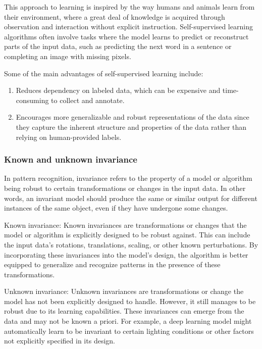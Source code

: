This approach to learning is inspired by the way humans and animals learn from their environment, where a great deal of knowledge is acquired through observation and interaction without explicit instruction. Self-supervised learning algorithms often involve tasks where the model learns to predict or reconstruct parts of the input data, such as predicting the next word in a sentence or completing an image with missing pixels.

Some of the main advantages of self-supervised learning include:

\begin{enumerate}
\item Reduces dependency on labeled data, which can be expensive and time-consuming to collect and annotate.
\item Encourages more generalizable and robust representations of the data since they capture the inherent structure and properties of the data rather than relying on human-provided labels.
\end{enumerate} 

\subsubsection{Known and unknown invariance}

In pattern recognition, invariance refers to the property of a model or algorithm being robust to certain transformations or changes in the input data. In other words, an invariant model should produce the same or similar output for different instances of the same object, even if they have undergone some changes.

Known invariance: Known invariances are transformations or changes that the model or algorithm is explicitly designed to be robust against. This can include the input data's rotations, translations, scaling, or other known perturbations. By incorporating these invariances into the model's design, the algorithm is better equipped to generalize and recognize patterns in the presence of these transformations.

Unknown invariance: Unknown invariances are transformations or change the model has not been explicitly designed to handle. However, it still manages to be robust due to its learning capabilities. These invariances can emerge from the data and may not be known a priori. For example, a deep learning model might automatically learn to be invariant to certain lighting conditions or other factors not explicitly specified in its design.


